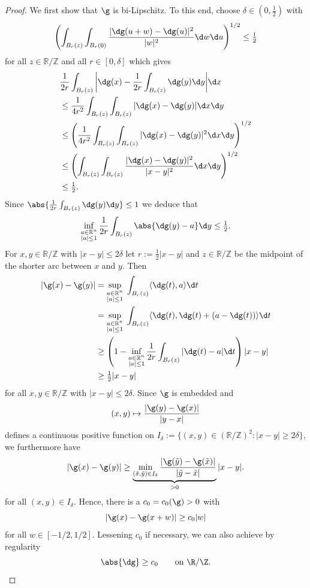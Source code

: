 \begin{proof}
  We first show that $\g$ is bi-Lipschitz. To this end, choose $\delta\in(0,\frac12)$ with
\begin{equation*}
 \left(\int_{B_r(z)} \int_{B_r(0)} \frac
   {|\dg(u+w)-\dg(u)|^{2}}{|w|^{2}} \d w \d u\right)^{1/2} \leq \tfrac12
\end{equation*}
for all $z \in \mathbb R / \mathbb Z$ and all $r \in[0,\delta]$ which gives
\begin{align*}
  &\frac 1 {2r}\int_{B_r (z)}\bigg| \dg(x) - \frac 1 {2r}  \int_{B_r(z)} \dg(y) \d y\bigg| \d x \\
  &\leq \frac  1 {4r^2} \int_{B_r(z)} \int_{B_r(z)}  |\dg(x) - \dg(y)| \d x \d y \\
  &\leq \left(  \frac 1 {4r^2} \int_{B_r(z)} \int_{B_r(z)}
  |\dg(x) - \dg(y)|^{2} \d x \d y\right)^{1/2} \\
  &\leq \left( \int_{B_r(z)}  \int_{B_r(z)}
  \frac{|\dg(x) - \dg(y)|^{2}}{|x-y|^{2}} \d x \d y\right)^{1/2} \\
  &\leq \tfrac 1 2 .
\end{align*}
Since $\abs{\frac 1 {2r}  \int_{B_r(z)} \dg(y)
  \d y} \leq 1$  we deduce that
\begin{equation*}
  \inf_{\substack{a\in \mathbb R^n \\ |a|\leq 1}} \frac 1 {2r} \int_{B_r(z)} \abs{\dg(y)-a} \d y \leq \tfrac 1 2.
\end{equation*}
For $x,y \in \mathbb R / \mathbb Z$ with $|x-y| \leq 2\delta$ let $r:=
\tfrac12|x-y|$ and $z \in \mathbb R / \mathbb Z$ be the midpoint of
the shorter arc between $x$ and $y$. Then
\begin{align*}
  |\g(x)-\g(y)| &= \sup_{\substack{a\in \mathbb R^n \\ |a|\leq 1}}\;
  \int_{B_r(z)}\langle \dg(t),a\rangle \d t\\
 &= \sup_{\substack{a\in \mathbb R^n \\ |a|\leq 1}} \; \int_{B_r(z)}\langle
 \dg(t) ,\dg(t) + (a-\dg(t))\rangle \d t\\
&\geq \left( 1 - \inf_{\substack{a\in \mathbb R^n \\ |a|\leq 1}}
  \frac 1 {2r}\int_{B_{r}(z) }|\dg(t)-a|\d t \right) |x-y| \\
  &\geq\tfrac 12 |x-y|
\end{align*}
for all $x,y \in \mathbb R / \mathbb Z$ with $|x-y|\leq 2\delta$.
Since $\g$ is embedded and
\[ (x,y) \mapsto \frac
{|\g(y)-\g(x)|}{|y-x|} \]
 defines a continuous positive function on
$I_\delta :=\{(x,y) \in (\mathbb R / \mathbb Z)^2: |x-y| \geq 2\delta\}$, we furthermore have
\begin{equation*}
  |\g(x) - \g(y)| \geq \underbrace{\min_{(\tilde x,\tilde y) \in I_\delta}\frac {|\g(\tilde y)-\g(\tilde x)|}{|\tilde y-\tilde x|}}_{>0} |x-y|.
\end{equation*}
for all $(x,y) \in I_\delta$.
Hence, there is a $c_0=c_0(\g)>0$ with
\begin{equation*}
 |\g(x) - \g(x+w)| \geq c_0 |w|
\end{equation*}
for all $w \in [-1/2, 1/2]$.
Lessening $c_0$ if necessary, we can also achieve by regularity
\[ \abs{\dg}\ge c_0 \qquad\text{on }\R/\Z. \]


\end{proof}
